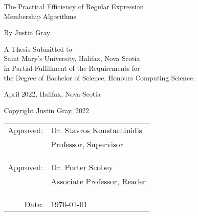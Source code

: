 \begin{titlepage}
  \begin{center}
    {\Large The Practical Efficiency of Regular Expression\\
    Membership Algorithms}
    
    \vspace{1cm}
    
    By Justin Gray

    \vspace{1cm}
    
    \begin{singlespace}
    	A Thesis Submitted to \\ 
    	Saint Mary's University, Halifax, Nova Scotia \\
    	in Partial Fulfillment of the Requirements for \\
      the Degree of Bachelor of Science, Honours Computing Science.
    \end{singlespace}
    
    \vspace{1cm}
    
    April 2022, Halifax, Nova Scotia
    
    \vspace{1cm}
    
    Copyright Justin Gray, 2022
    
    \vfill
    
    {\flushright\singlespacing
      \begin{tabular}{ r l }
      	Approved: & Dr. Stavros Konstantinidis \\
      	\empty & Professor, Supervisor \\
      	\empty & \empty \\
      	\empty & \empty \\
      	\empty & \empty \\
      	
      	Approved: & Dr. Porter Scobey \\
      	\empty & Associate Professor, Reader \\
      	\empty & \empty \\
      	\empty & \empty \\
      	\empty & \empty \\
      	
      	Date: & \today
      \end{tabular}\\    
    }    
  \end{center}
\end{titlepage}
